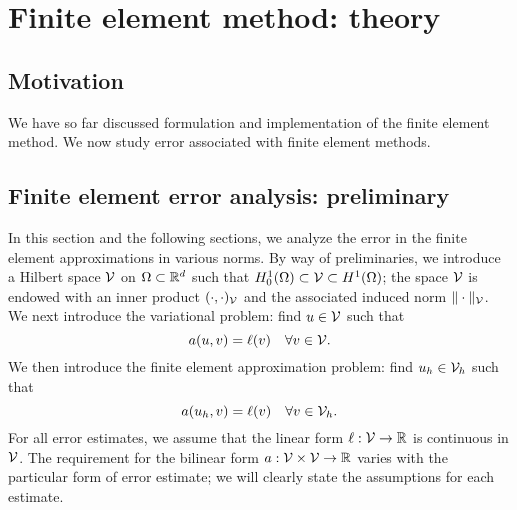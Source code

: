 \chapter{Finite element method: theory}

\disclaimer

\section{Motivation}
We have so far discussed formulation and implementation of the finite element method.  We now study error associated with finite element methods.



\section{Finite element error analysis: preliminary}
In this section and the following sections, we analyze the error in the finite element approximations in various norms. By way of preliminaries, we introduce a Hilbert space $\mathcal{V}$ on $\Omega \subset \mathbb{R}^d$ such that $H^1_0(\Omega) \subset \mathcal{V} \subset H^1(\Omega)$; the space $\mathcal{V}$ is endowed with an inner product $(\cdot,\cdot)_{\mathcal{V}}$ and the associated induced norm $\| \cdot \|_{\mathcal{V}}$. We next introduce the variational problem: find $u \in \mathcal{V}$ such that
\begin{equation}
  a(u,v) = \ell(v) \quad \forall v \in \mathcal{V}. \label{eq:th_pde}
\end{equation}
We then introduce the finite element approximation problem: find $u_h \in \mathcal{V}_h$ such that
\begin{equation}
  a(u_h,v) = \ell(v) \quad \forall v \in \mathcal{V}_h. \label{eq:th_fe}
\end{equation}
For all error estimates, we assume that the linear form $\ell:\mathcal{V} \to \mathbb{R}$ is continuous in $\mathcal{V}$.  The requirement for the bilinear form $a:\mathcal{V} \times \mathcal{V} \to \mathbb{R}$ varies with the particular form of error estimate; we will clearly state the assumptions for each estimate.

